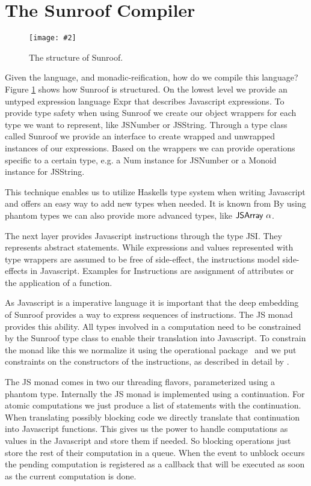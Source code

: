 \documentclass{llncs}
\newcommand{\Src}[1]{{\sf #1}}
\newcommand{\Figure}[3]{%
\begin{figure}[h]%
\vspace{-0.5cm}%
\begin{center}%
\texttt{[image: \#2]}%
\vspace{-0.5cm}%
\end{center}%
\caption{#3}%
\label{#1}%
\vspace{-0.5cm}%
\end{figure}%
}
\begin{document}
\section{The Sunroof Compiler}
        
\Figure{fig:structure}{../figures/sunroof-structure.pdf}{The structure of Sunroof.}

Given the language, and monadic-reification, how do we  compile this language? 
Figure \ref{fig:structure} shows how Sunroof is structured.
On the lowest level we provide an untyped expression language \Src{Expr}
that describes Javascript expressions. 
To provide type safety when using Sunroof we create our object
wrappers for each type we want to represent, like \Src{JSNumber} or \Src{JSString}.
Through a type class called \Src{Sunroof} we provide an interface to create wrapped and unwrapped
instances of our expressions. Based on the wrappers we can provide 
operations specific to a certain type, e.g. a \Src{Num} instance
for \Src{JSNumber} or a \Src{Monoid} instance for \Src{JSString}.

This technique enables us to utilize  Haskells type system when writing Javascript
and offers an easy way to add new types when needed. It is known from 
\citet{Svenningsson:12:CombiningEmbedding} 
By using phantom types we can also provide more advanced types,
like $\Src{JSArray\ \alpha}$.

The next layer provides Javascript instructions through the type \Src{JSI}.
They represents abstract statements. While expressions and values
represented with type wrappers are assumed to be free of side-effect,
the instructions model side-effects in Javascript. Examples for Instructions
are assignment of attributes or the application of a function.

As Javascript is a imperative language it is important that the deep embedding
of Sunroof provides a way to express sequences of instructions. 
The \Src{JS} monad provides this ability.
All types involved in a computation need to be constrained by the 
\Src{Sunroof} type class to enable their translation into Javascript.
To constrain the monad like this we normalize it using the operational
package~\cite{Hackage:10:Operational,Apfelmus:10:Operational} and
we put constraints on the constructors of the instructions,
as described in detail by \citep{Sculthorpe:13:ConstrainedMonads}.

The \Src{JS} monad comes in two our threading flavors, parameterized using a phantom type.
Internally the \Src{JS} monad is implemented using a continuation. For atomic
computations we just produce a list of statements with the continuation. 
When translating possibly blocking code we directly translate that continuation
into Javascript functions. This gives us the power to handle 
computations as values in the Javascript and store them if needed.
So blocking operations just store the rest of their computation in a queue.
When the event to unblock occurs the pending computation is registered 
as a callback that will be executed as soon as the current computation
is done.
\end{document}
